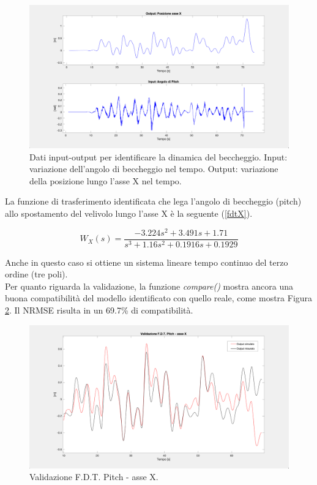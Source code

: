 \begin{figure}[H]
	\centering
	\includegraphics[width=1\textwidth]{gfx/SysId/px_input}
	\caption[Dati input-output per identificare la dinamica del beccheggio.]{Dati input-output per identificare la dinamica del beccheggio. Input: variazione dell'angolo di beccheggio nel tempo. Output: variazione della posizione lungo l'asse X nel tempo.}
	\label{fig:px_input}
\end{figure}

La funzione di trasferimento identificata che lega l'angolo di beccheggio (pitch) allo spostamento del velivolo lungo l'asse X è la seguente (\ref{fdtX}).

\begin{equation}
	W_X(s) = \frac{-3.224s^2 + 3.491s + 1.71}{s^3 + 1.16s^2 + 0.1916s + 0.1929}
	\label{fdtX}
\end{equation}

Anche in questo caso si ottiene un sistema lineare tempo continuo del terzo ordine (tre poli).\\

Per quanto riguarda la validazione, la funzione \emph{compare()} \cite{compare} mostra ancora una buona compatibilità del modello identificato con quello reale, come mostra Figura \ref{fig:px_model}. Il \acs{NRMSE} risulta in un 69.7\% di compatibilità.

\begin{figure}[H]
	\centering
	\includegraphics[width=1\textwidth]{gfx/SysId/px_model}
	\caption[Validazione F.D.T. Pitch - asse X.]{Validazione F.D.T. Pitch - asse X.}
	\label{fig:px_model}
\end{figure}

